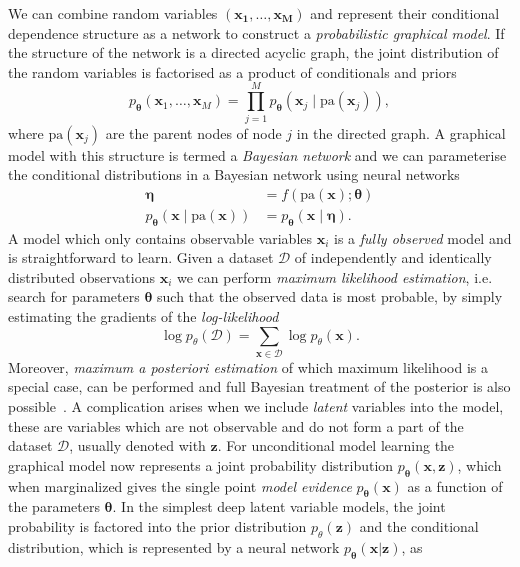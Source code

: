 We can combine random variables $(\mathbf{x_1}, \ldots, \mathbf{x_M})$ and represent their conditional dependence structure as a network to construct a \emph{probabilistic graphical model}. If the structure of the network is a directed acyclic graph, the joint distribution of the random variables is factorised as a product of conditionals and priors
\begin{equation}
	p_{\boldsymbol{\theta}}\left(\mathbf{x}_{1}, \ldots, \mathbf{x}_{M}\right)=\prod_{j=1}^{M} p_{\boldsymbol{\theta}}\left(\mathbf{x}_{j} \mid \mathrm{pa}(\mathbf{x}_{j})\right),
\end{equation}
where $ \mathrm{pa}(\mathbf{x}_{j})$ are the parent nodes of node $j$ in the directed graph. A graphical model with this structure is termed a \emph{Bayesian network} and we can parameterise the conditional distributions in a Bayesian network using neural networks
\begin{equation}
	\begin{aligned} 
		\boldsymbol{\eta} &=f(\mathrm{pa}(\mathbf{x}); \boldsymbol{\theta}) \\ p_{\boldsymbol{\theta}}(\mathbf{x} \mid \mathrm{pa}(\mathbf{x})) &=p_{\boldsymbol{\theta}}(\mathbf{x} \mid \boldsymbol{\eta}). 
	\end{aligned}
\end{equation}
A model which only contains observable variables $\mathbf{x}_i$ is a \emph{fully observed} model and is straightforward to learn. Given a dataset $\mathcal D$ of {independently and identically distributed} observations $\mathbf{x}_i$ we can perform \emph{maximum likelihood estimation}, i.e. search for parameters $\boldsymbol{\theta}$ such that the observed data is most probable, by simply estimating the gradients of the \emph{log-likelihood}
\begin{equation}
	\log p_{\theta}(\mathcal{D})=\sum_{\mathbf{x} \in \mathcal{D}} \log p_{\theta}(\mathbf{x}).
\end{equation}
Moreover, \emph{maximum a posteriori estimation} of which maximum likelihood is a special case, can be performed and full Bayesian treatment of the posterior is also possible~\cite{kingma2017variational}. 
A complication arises when we include \emph{latent} variables into the model, these are variables which are not observable and do not form a part of the dataset $\mathcal D$, usually denoted with $\mathbf{z}$. For unconditional model learning the graphical model now represents a joint probability distribution $p_{\boldsymbol{\theta}}(\mathbf{x}, \mathbf{z})$, which when marginalized gives the single point \emph{model evidence} $p_{\boldsymbol{\theta}}(\mathbf{x})$ as a function of the parameters $\boldsymbol{\theta}$. In the simplest deep latent variable models, the joint probability is factored into the prior distribution $p_{\theta}(\mathbf{z})$ and the conditional distribution, which is represented by a neural network $p_{\boldsymbol{\theta}}(\mathbf{x}|\mathbf{z})$,  as
